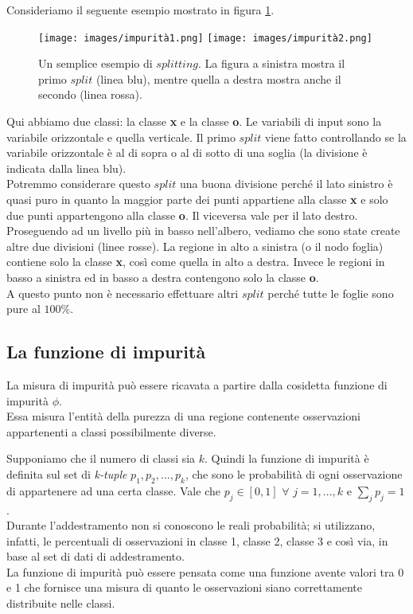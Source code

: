Consideriamo il seguente esempio \cite{split:online} mostrato in figura \ref{fig:impurità}. 
\begin{figure}[ht]
\begin{center}
\texttt{[image: images/impurità1.png]}
\texttt{[image: images/impurità2.png]}
\end{center}
\caption{Un semplice esempio di $splitting$. La figura a sinistra mostra il primo $split$ (linea blu), mentre quella a destra mostra anche il secondo (linea rossa).}
\label{fig:impurità}
\end{figure}
Qui abbiamo due classi: la classe \textbf{x} e la classe \textbf{o}. Le variabili di input sono la variabile orizzontale e quella verticale. Il primo $split$ viene fatto controllando se la variabile orizzontale è al di sopra o al di sotto di una soglia (la divisione è indicata dalla linea blu).\\
Potremmo considerare questo $split$ una buona divisione perché il lato sinistro è quasi puro in quanto la maggior parte dei punti appartiene alla classe \textbf{x} e solo due punti appartengono alla classe \textbf{o}. Il viceversa vale per il lato destro.\\
Proseguendo ad un livello più in basso nell'albero, vediamo che sono state create altre due divisioni (linee rosse). La regione in alto a sinistra (o il nodo foglia) contiene solo la classe \textbf{x}, così come quella in alto a destra. Invece le regioni in basso a sinistra ed in basso a destra contengono solo la classe \textbf{o}.\\
A questo punto non è necessario effettuare altri $split$ perché tutte le foglie sono pure al $100\%$.


\subsection{La funzione di impurità}
\label{subsec:impurita}
La misura di impurità può essere ricavata a partire dalla cosidetta funzione di impurità $\phi$.\\
Essa misura l'entità della purezza di una regione contenente osservazioni appartenenti a classi possibilmente diverse.

Supponiamo che il numero di classi sia $k$. Quindi la funzione di impurità è definita sul set di \textit{k-tuple} $p_{1},p_{2},...,p_{k}$, che sono le probabilità di ogni osservazione di appartenere ad una certa classe. Vale che $p_{j} \in[0,1]$ $\forall$  $j=1,...,k$ e $\sum_{j} p_{j}=1$.\\
Durante l'addestramento non si conoscono le reali probabilità; si utilizzano, infatti, le percentuali di osservazioni in classe 1, classe 2, classe 3 e così via, in base al set di dati di addestramento.\\
La funzione di impurità può essere pensata come una funzione avente valori tra 0 e 1 che fornisce una misura di quanto le osservazioni siano correttamente distribuite nelle classi.


